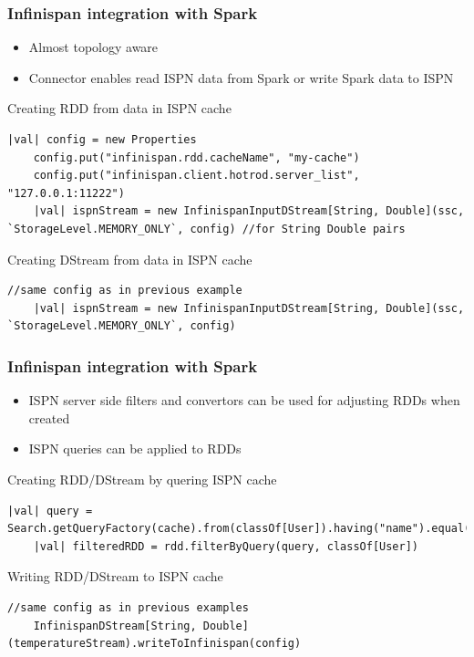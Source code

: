 \documentclass[10pt,utf8]{beamer}
\begin{document}
\begin{frame}[fragile]
	\frametitle{Infinispan integration with Spark}
	\begin{itemize}
		\item Almost topology aware
		\item Connector enables read ISPN data from Spark or write Spark data to ISPN
	\end{itemize}
	\vspace{0.5cm}
	Creating RDD from data in ISPN cache
	\begin{lstlisting}[style=Java]
    |val| config = new Properties
    config.put("infinispan.rdd.cacheName", "my-cache")
    config.put("infinispan.client.hotrod.server_list", "127.0.0.1:11222")
    |val| ispnStream = new InfinispanInputDStream[String, Double](ssc, `StorageLevel.MEMORY_ONLY`, config) //for String Double pairs
	\end{lstlisting}
	\vspace{0.5cm}
	Creating DStream from data in ISPN cache
	\begin{lstlisting}[style=Java]
    //same config as in previous example
    |val| ispnStream = new InfinispanInputDStream[String, Double](ssc, `StorageLevel.MEMORY_ONLY`, config)
	\end{lstlisting}
\end{frame}

\begin{frame}[fragile]
	\frametitle{Infinispan integration with Spark}
	\begin{itemize}
	 \item ISPN server side filters and convertors can be used for adjusting RDDs when created 
	 \item ISPN queries can be applied to RDDs
	\end{itemize}
	\vspace{0.5cm}
	Creating RDD/DStream by quering ISPN cache
	\begin{lstlisting}[style=Java]
    |val| query = Search.getQueryFactory(cache).from(classOf[User]).having("name").equal("Vojtech").toBuilder[RemoteQuery].build
    |val| filteredRDD = rdd.filterByQuery(query, classOf[User])
	\end{lstlisting}
	\vspace{0.5cm}
	Writing RDD/DStream to ISPN cache
		\begin{lstlisting}[style=Java]
    //same config as in previous examples
    InfinispanDStream[String, Double](temperatureStream).writeToInfinispan(config)
	\end{lstlisting}
\end{frame}
\end{document}

